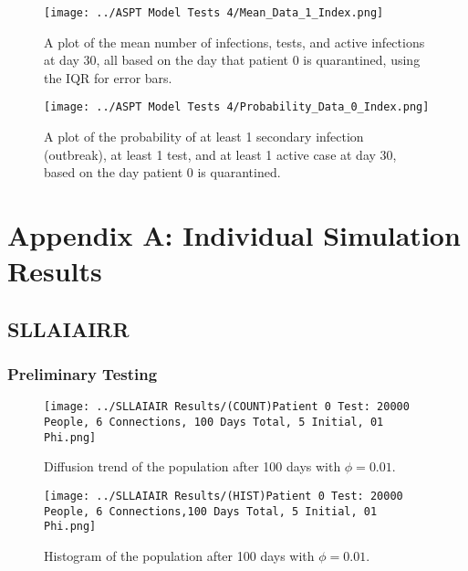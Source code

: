 \documentclass{article}
\numberwithin{equation}{section} %
\begin{document}
\begin{figure}[H]
  \centering
  \texttt{[image: ../ASPT Model Tests 4/Mean\_Data\_1\_Index.png]}
  \caption{A plot of the mean number of infections, tests, and active infections at day 30, all based on the day that patient 0 is quarantined, using the IQR for error bars.}
\end{figure}

\begin{figure}[H]
  \centering
  \texttt{[image: ../ASPT Model Tests 4/Probability\_Data\_0\_Index.png]}
  \caption{A plot of the probability of at least 1 secondary infection (outbreak), at least 1 test, and at least 1 active case at day 30, based on the day patient 0 is quarantined.}
\end{figure}


\newpage
\section{Appendix A: Individual Simulation Results}
\subsection{SLLAIAIRR}
\subsubsection{Preliminary Testing}
\begin{figure}[H]
  \centering
  \begin{minipage}{0.45\textwidth}
    \centering
    \texttt{[image: ../SLLAIAIR Results/(COUNT)Patient 0 Test: 20000 People, 6 Connections, 100 Days Total, 5 Initial, 01 Phi.png]} %
    \caption{Diffusion trend of the population after 100 days with $\phi = 0.01$.}
  \end{minipage}\hfill
  \begin{minipage}{0.45\textwidth}
    \centering
    \texttt{[image: ../SLLAIAIR Results/(HIST)Patient 0 Test: 20000 People, 6 Connections,100 Days Total, 5 Initial, 01 Phi.png]} %
    \caption{Histogram of the population after 100 days with $\phi = 0.01$.}
  \end{minipage}
\end{figure}
\end{document}
